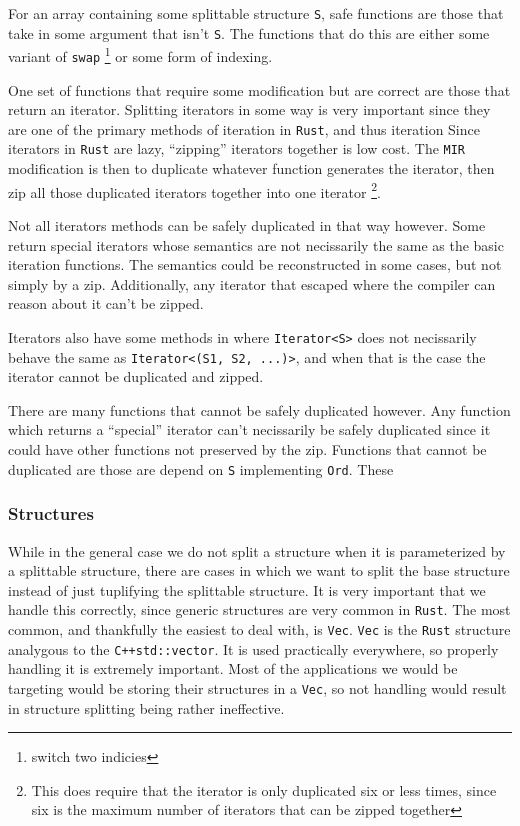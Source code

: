 \documentclass[12pt,oneside]{book}
\newcommand{\rustname}{{\texttt{Rust}}}
\def \rust {\rustname{}\xspace}
\newcommand{\cppname}{{\texttt{C++}}}
\def \cpp {\cppname{}\xspace}
\newcommand{\mirname}{{\texttt{MIR}}}
\def \mir {\mirname{}\xspace}
\newcommand{\vecname}{{\texttt{Vec}}}
\def \vec{\vecname{}\xspace}
\begin{document}
For an array containing some splittable structure \texttt{S},
safe functions are those that take in some argument that isn't \texttt{S}.
The functions that do this are either some variant of \texttt{swap}
\footnote{switch two indicies} or some form of indexing. 

One set of functions that require some modification but are correct are
those that return an iterator. Splitting iterators in some way
is very important since they are one of the primary methods of 
iteration in \rust, and thus iteration 
Since iterators in \rust are lazy, ``zipping'' iterators together is
low cost. The \mir modification is 
then to duplicate whatever function generates the iterator, then
zip all those duplicated iterators together into one iterator
\footnote{This does require that the iterator is only duplicated
six or less times, since six is the maximum number of
iterators that can be zipped together}.

Not all iterators methods can be safely duplicated in that way however. 
Some return special iterators whose semantics are not necissarily
the same as the basic iteration functions. The semantics could be 
reconstructed in some cases, but not simply by a zip. Additionally,
any iterator that escaped where the compiler can reason about it
can't be zipped. 

Iterators also have some methods in where 
\texttt{Iterator<S>} does not necissarily behave the same as 
\texttt{Iterator<(S1, S2, ...)>}, and when that is the case the iterator
cannot be duplicated and zipped.

There are many functions that cannot be safely duplicated however.
Any function which returns a ``special'' iterator can't necissarily
be safely duplicated since it could have other functions not preserved 
by the zip.
Functions that cannot be duplicated are those are depend on \texttt{S}
implementing \texttt{Ord}. These

\subsubsection{Structures}
\label{sec:param}
While in the general case we do not split a structure when 
it is parameterized by
a splittable structure, there are cases in 
which we want to split the base structure
instead of just tuplifying the splittable structure. It is very important
that we handle this correctly, since generic structures 
are very common in \rust. The most common,
and thankfully the easiest to deal with, 
is \vec. \vec is the \rust structure analygous
to the \cpp \texttt{std::vector}. 
It is used practically everywhere, so properly handling it
is extremely important. Most of the applications 
we would be targeting would be storing
their structures in a \vec, 
so not handling would result in structure splitting being
rather ineffective.
\end{document}
